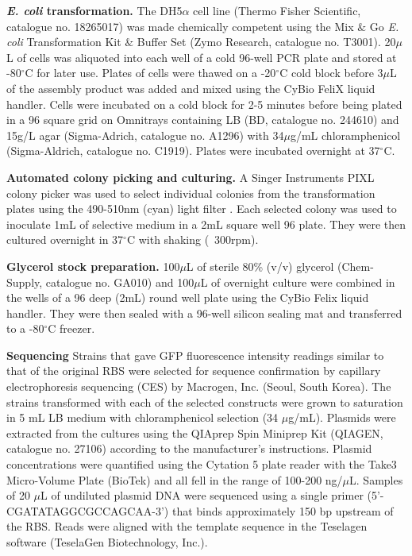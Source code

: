 \textbf{\textit{E. coli} transformation.}
The DH5$\alpha$ cell line (Thermo Fisher Scientific, catalogue no. 18265017) was made chemically competent using the Mix $\&$ Go \textit{E. coli} Transformation Kit $\&$ Buffer Set (Zymo Research, catalogue no. T3001).
20$\mu$L of cells was aliquoted into each well of a cold 96-well PCR plate and stored at -80$^{\circ}$C for later use.
Plates of cells were thawed on a -20$^{\circ}$C cold block before 3$\mu$L of the assembly product was added and mixed using the CyBio FeliX liquid handler.
Cells were incubated on a cold block for 2-5 minutes before being plated in a 96 square grid on Omnitrays containing LB (BD, catalogue no. 244610) and 15g/L agar (Sigma-Adrich, catalogue no. A1296) with 34$\mu$g/mL chloramphenicol (Sigma-Aldrich, catalogue no. C1919).
Plates were incubated overnight at 37$^{\circ}$C. 

\textbf{Automated colony picking and culturing.}
A Singer Instruments PIXL colony picker was used to select individual colonies from the transformation plates using the 490-510nm (cyan) light filter .
Each selected colony was used to inoculate 1mL of selective medium in a 2mL square well 96 plate.
They were then cultured overnight in 37$^{\circ}$C with shaking (~300rpm).

\textbf{Glycerol stock preparation.}
100$\mu$L of sterile 80\% (v/v) glycerol (Chem-Supply, catalogue no. GA010) and 100$\mu$L of overnight culture were combined in the wells of a 96 deep (2mL) round well plate using the CyBio Felix liquid handler.
They were then sealed with a 96-well silicon sealing mat and transferred to a -80$^{\circ}$C freezer. 

\textbf{Sequencing}
Strains that gave GFP fluorescence intensity readings similar to that of the original RBS were selected for sequence confirmation by capillary electrophoresis sequencing (CES) by Macrogen, Inc. (Seoul, South Korea).
The strains transformed with each of the selected constructs were grown to saturation in 5 mL LB medium with chloramphenicol selection (34 $\mu$g/mL).
Plasmids were extracted from the cultures using the QIAprep Spin Miniprep Kit (QIAGEN, catalogue no. 27106) according to the manufacturer's instructions.
Plasmid concentrations were quantified using the Cytation 5 plate reader with the Take3 Micro-Volume Plate (BioTek) and all fell in the range of 100-200 ng/$\mu$L.
Samples of 20 $\mu$L of undiluted plasmid DNA were sequenced using a single primer (5'-CGATATAGGCGCCAGCAA-3') that binds approximately 150 bp upstream of the RBS.
Reads were aligned with the template sequence in the Teselagen software (TeselaGen Biotechnology, Inc.).

